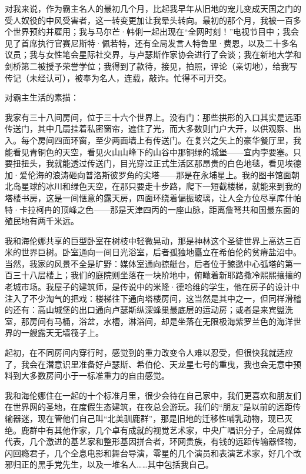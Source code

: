 \documentclass[AutoFakeBold=true]{book}
\begin{document}
对我来说，作为霸主名人的最初几个月，比起我早年从旧地的宠儿变成天国之门的受人奴役的中风受害者，这一转变更加让我晕头转向。最初的那个月，我被一百多个世界预约并雇用；我与马尔芒·韩俐一起出现在``全网时刻！''电视节目中；我会见了首席执行官赛尼斯特·佩若特，还有全局发言人特鲁里·费恩，以及二十多名议员；我与女性笔会星际社交界，与卢瑟斯作家协会进行了会谈；我在新地大学和剑桥第二被授予荣誉学位；我得到了款待，接见，拍照，评论（亲切地），给我写传记（未经认可），被奉为名人，连载，敲诈。忙得不可开交。

\vspace*{1em}

对霸主生活的素描：

我家有三十八间房间，位于三十六个世界上。没有门：那些拱形的入口其实是远距传送门，其中几扇挂着私密窗帘，遮住了光，而大多数则门户大开，以供观察、出入。每个房间四面环窗，至少两面墙上有传送门。在复兴之矢上的豪华餐厅里，我能看见青铜色的天空，看见火山山峰下的山谷中那铜绿的城堡——宜内孛要塞。只要扭扭头，我就能透过传送门，目光穿过正式生活区那昂贵的白色地毯，看见埃德加·爱伦海的浪涛砸向普洛斯彼罗角的尖塔——那是在永埔星上。我的图书馆面朝北岛星球的冰川和绿色天空，在那只要走十步路，爬下一短截楼梯，就能来到我的塔楼书房，这是一间惬意的露天房，四面环绕着偏振玻璃，让人全方位尽享库什帕特·卡拉柯冉的顶峰之色——那是天津四丙的一座山脉，距离詹弩共和国最东面的殖民地有两千米远。

我和海伦娜共享的巨型卧室在树枝中轻微晃动，那是神林这个圣徒世界上高达三百米的世界巨树。卧室通向一间日光浴室，后者孤独地矗立在希伯伦的贫瘠盐沼中。当然，我家的风景不全是旷野：媒体室通向掠艇台，后者位于鲸逖中心弧塔的第一百三十八层楼上；我们的庭院则坐落在一块阶地中，俯瞰着新耶路撒冷熙熙攘攘的老城市场。我屋子的建筑师，是传说中的米隆·德哈维的学生，他在房子的设计中注入了不少淘气的把戏：楼梯往下通向塔楼房间，这当然是其中之一，但同样滑稽的还有：高山城堡的出口通向卢瑟斯纵深蜂巢最底层的运动房；或者是来宾盥洗室，那房间有马桶，浴盆，水槽，淋浴间，却是坐落在无限极海紫罗兰色的海洋世界的一艘露天无墙筏子上。

起初，在不同房间内穿行时，感觉到的重力改变令人难以忍受，但很快我就适应了，我会在潜意识里准备好卢瑟斯、希伯伦、天龙星七号的重曳，我也会无意中预料到大多数房间小于一标准重力的自由感觉。

我和海伦娜住在一起的十个标准月里，很少会待在自己家中，我们更喜欢和朋友们在世界网的圣地，在度假生态建筑，在夜总会游玩。我们的``朋友''是以前的远距传输器迷，现在管他们自己叫``北美驯鹿群''，那是旧地的迁移性哺乳动物，现已灭绝。鹿群中有其他作家，几个卓有成就的视觉艺术家，中央广唱识分子，全局媒体代表，几个激进的基艺家和整形基因拼合者，环网贵族，有钱的远距传输器怪物，闪回瘾君子，几个全息电影和舞台导演，零星的几个演员和表演艺术家，好几个改邪归正的黑手党先生，以及一堆名人……其中包括我自己。
\end{document}
